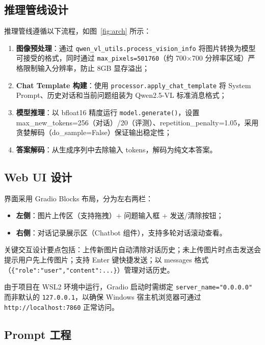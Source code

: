 \documentclass{SYSUReport}
\begin{document}
\subsection{推理管线设计}

推理管线遵循以下流程，如图~\ref{fig:arch} 所示：

\begin{enumerate}[label=步骤 \arabic*:,leftmargin=*]
    \item \textbf{图像预处理}：通过 \texttt{qwen\_vl\_utils.process\_vision\_info} 将图片转换为模型可接受的格式，同时通过 \texttt{max\_pixels=501760}（约 700$\times$700 分辨率区域）严格限制输入分辨率，防止 8GB 显存溢出；
    \item \textbf{Chat Template 构建}：使用 \texttt{processor.apply\_chat\_template} 将 System Prompt、历史对话和当前问题组装为 Qwen2.5-VL 标准消息格式；
    \item \textbf{模型推理}：以 bfloat16 精度运行 \texttt{model.generate()}，设置 max\_new\_tokens=256（对话）/20（评测）、repetition\_penalty=1.05，采用贪婪解码（do\_sample=False）保证输出稳定性；
    \item \textbf{答案解码}：从生成序列中去除输入 tokens，解码为纯文本答案。
\end{enumerate}

\subsection{Web UI 设计}

界面采用 Gradio Blocks 布局，分为左右两栏：

\begin{itemize}
    \item \textbf{左侧}：图片上传区（支持拖拽）+ 问题输入框 + 发送/清除按钮；
    \item \textbf{右侧}：对话记录展示区（Chatbot 组件），支持多轮对话滚动查看。
\end{itemize}

关键交互设计要点包括：上传新图片自动清除对话历史；未上传图片时点击发送会提示用户先上传图片；支持 Enter 键快捷发送；以 messages 格式（\lstinline|{"role":"user","content":...}|）管理对话历史。

由于项目在 WSL2 环境中运行，Gradio 启动时需绑定 \texttt{server\_name="0.0.0.0"} 而非默认的 \texttt{127.0.0.1}，以确保 Windows 宿主机浏览器可通过 \texttt{http://localhost:7860} 正常访问。

\subsection{Prompt 工程}
\end{document}
